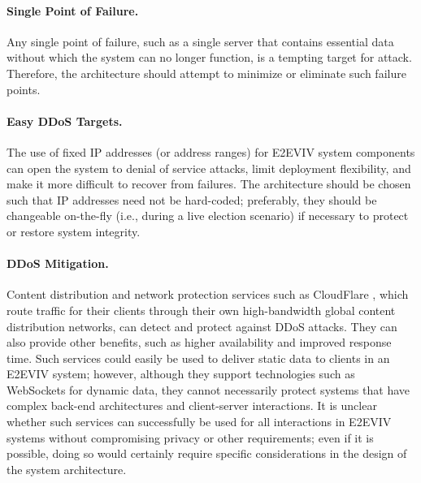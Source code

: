 \paragraph {Single Point of Failure.} Any single point of failure,
such as a single server that contains essential data without which the
system can no longer function, is a tempting target for
attack. Therefore, the architecture should attempt to minimize or
eliminate such failure points.

\paragraph{Easy DDoS Targets.} The use of fixed IP addresses (or
address ranges) for E2EVIV system components can open the system to
denial of service attacks, limit deployment flexibility, and make it
more difficult to recover from failures. The architecture should be
chosen such that IP addresses need not be hard-coded; preferably, they
should be changeable on-the-fly (i.e., during a live election
scenario) if necessary to protect or restore system integrity.

\paragraph{DDoS Mitigation.} Content distribution and network
protection services such as CloudFlare \cite{CloudFlare}, which route
traffic for their clients through their own high-bandwidth global
content distribution networks, can detect and protect against DDoS
attacks. They can also provide other benefits, such as higher
availability and improved response time. Such services could easily be
used to deliver static data to clients in an E2EVIV system; however,
although they support technologies such as WebSockets for dynamic
data, they cannot necessarily protect systems that have complex
back-end architectures and client-server interactions. It is unclear
whether such services can successfully be used for all interactions in
E2EVIV systems without compromising privacy or other requirements;
even if it is possible, doing so would certainly require specific
considerations in the design of the system architecture.

